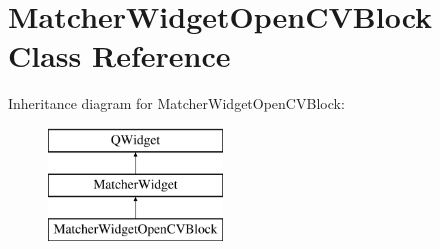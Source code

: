 \hypertarget{class_matcher_widget_open_c_v_block}{}\section{Matcher\+Widget\+Open\+C\+V\+Block Class Reference}
\label{class_matcher_widget_open_c_v_block}
Inheritance diagram for Matcher\+Widget\+Open\+C\+V\+Block\+:\begin{figure}[H]
\begin{center}
\leavevmode
\includegraphics[height=3.000000cm]{class_matcher_widget_open_c_v_block}
\end{center}
\end{figure}
